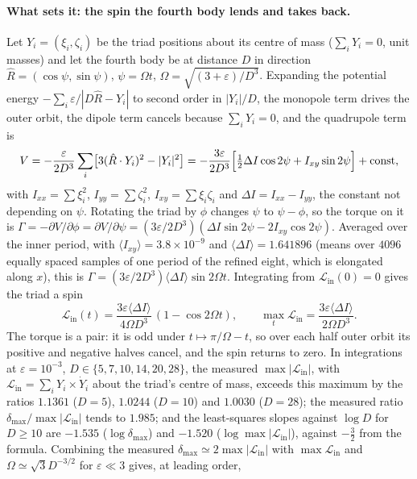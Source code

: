 \documentclass[11pt]{article}
\theoremstyle{definition}\newtheorem{definition}[theorem]{Definition}
\theoremstyle{remark}\newtheorem{remark}[theorem]{Remark}
\begin{document}
\paragraph{What sets it: the spin the fourth body lends and takes back.} Let $Y_i=(\xi_i,\zeta_i)$ be the triad positions about its centre of mass ($\sum_iY_i=0$, unit masses) and let the fourth body be at distance $D$ in direction $\hat R=(\cos\psi,\sin\psi)$, $\psi=\Omega t$, $\Omega=\sqrt{(3+\varepsilon)/D^3}$. Expanding the potential energy $-\sum_i\varepsilon/|D\hat R-Y_i|$ to second order in $|Y_i|/D$, the monopole term drives the outer orbit, the dipole term cancels because $\sum_iY_i=0$, and the quadrupole term is
\[
V=-\frac{\varepsilon}{2D^3}\sum_i\bigl[3(\hat R\cdot Y_i)^2-|Y_i|^2\bigr]=-\frac{3\varepsilon}{2D^3}\Bigl[\tfrac12\Delta I\cos2\psi+I_{xy}\sin2\psi\Bigr]+\text{const},
\]
with $I_{xx}=\sum\xi_i^2$, $I_{yy}=\sum\zeta_i^2$, $I_{xy}=\sum\xi_i\zeta_i$ and $\Delta I=I_{xx}-I_{yy}$, the constant not depending on $\psi$. Rotating the triad by $\phi$ changes $\psi$ to $\psi-\phi$, so the torque on it is $\Gamma=-\partial V/\partial\phi=\partial V/\partial\psi=(3\varepsilon/2D^3)(\Delta I\sin2\psi-2I_{xy}\cos2\psi)$. Averaged over the inner period, with $\langle I_{xy}\rangle=3.8\times10^{-9}$ and $\langle\Delta I\rangle=1.641896$ (means over $4096$ equally spaced samples of one period of the refined eight, which is elongated along $x$), this is $\Gamma=(3\varepsilon/2D^3)\langle\Delta I\rangle\sin2\Omega t$. Integrating from $\mathcal L_{\mathrm{in}}(0)=0$ gives the triad a spin
\[
\mathcal L_{\mathrm{in}}(t)=\frac{3\varepsilon\langle\Delta I\rangle}{4\Omega D^3}\,(1-\cos2\Omega t),\qquad \max_t\mathcal L_{\mathrm{in}}=\frac{3\varepsilon\langle\Delta I\rangle}{2\Omega D^3}.
\]
The torque is a pair: it is odd under $t\mapsto\pi/\Omega-t$, so over each half outer orbit its positive and negative halves cancel, and the spin returns to zero. In integrations at $\varepsilon=10^{-3}$, $D\in\{5,7,10,14,20,28\}$, the measured $\max|\mathcal L_{\mathrm{in}}|$, with $\mathcal L_{\mathrm{in}}=\sum_iY_i\times\dot Y_i$ about the triad's centre of mass, exceeds this maximum by the ratios $1.1361$ ($D=5$), $1.0244$ ($D=10$) and $1.0030$ ($D=28$); the measured ratio $\delta_{\max}/\max|\mathcal L_{\mathrm{in}}|$ tends to $1.985$; and the least-squares slopes against $\log D$ for $D\ge10$ are $-1.535$ ($\log\delta_{\max}$) and $-1.520$ ($\log\max|\mathcal L_{\mathrm{in}}|$), against $-\tfrac32$ from the formula. Combining the measured $\delta_{\max}\simeq2\max|\mathcal L_{\mathrm{in}}|$ with $\max\mathcal L_{\mathrm{in}}$ and $\Omega\simeq\sqrt3D^{-3/2}$ for $\varepsilon\ll3$ gives, at leading order,
\end{document}
